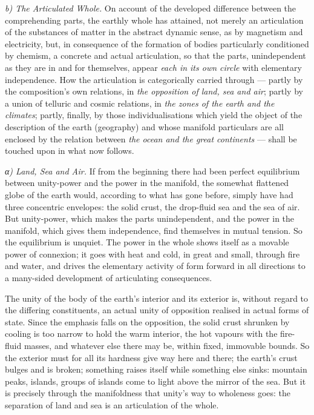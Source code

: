 \documentclass[12pt,a4paper]{book}
\newcommand{\runin}[1]{\emph{#1}\hspace{0.4em}}
\newcommand{\subrunin}[1]{\emph{#1}\hspace{0.4em}}
\begin{document}
\runin{b) The Articulated Whole.} On account of the developed difference between the comprehending parts, the earthly
whole has attained, not merely an articulation of the substances of matter in the abstract dynamic sense, as by magnetism
and electricity, but, in consequence of the formation of bodies particularly conditioned by chemism, a concrete and
actual articulation, so that the parts,
unindependent as they are in and for themselves, appear \emph{each in its own circle} with elementary independence. How
the articulation is categorically carried through --- partly by the composition's own relations, in \emph{the opposition
of land, sea and air}; partly by a union of telluric and cosmic relations, in \emph{the zones of the earth and the
climates}; partly, finally, by those individualisations which yield the object of the description of the earth
(geography) and whose manifold particulars are all enclosed by the relation between \emph{the ocean and the great
continents} --- shall be touched upon in what now follows.

\subrunin{α) Land, Sea and Air.} If from the beginning there had been perfect equilibrium between unity-power and the
power in the manifold, the somewhat flattened globe of the earth would, according to what has gone before, simply have
had three concentric envelopes: the solid crust, the drop-fluid sea and the sea of air. But unity-power, which makes the
parts unindependent, and the power in the manifold, which gives them independence, find themselves in mutual tension. So
the equilibrium is unquiet. The power in the whole shows itself as a movable power of connexion; it goes with heat and
cold, in great and small, through fire and water, and drives the elementary activity of form forward in all directions to
a many-sided development of articulating consequences.

The unity of the body of the earth's interior and its exterior is, without regard to the differing constituents, an
actual unity of opposition realised in actual forms of state. Since the emphasis falls on the opposition, the solid crust
shrunken by cooling is too narrow to hold the warm interior, the hot vapours with the fire-fluid masses, and whatever
else there may be, within fixed, immovable bounds. So the exterior must for all its hardness give way here and there; the
earth's crust bulges and is broken; something raises itself while something else sinks: mountain peaks, islands, groups
of islands come to light above the mirror of the sea. But it is precisely through the manifoldness
that unity's way to wholeness goes: the separation of land and sea is an articulation of the whole.
\end{document}
